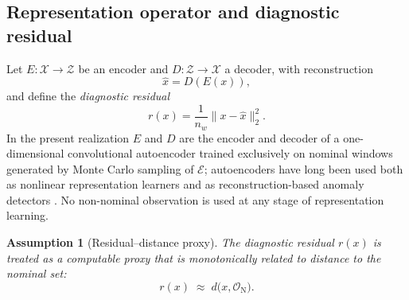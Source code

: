 \documentclass[a4paper]{cas-sc}
\newtheorem{assumption}{Assumption}
\newcommand{\X}{\ensuremath{\mathcal{X}}}
\newcommand{\Z}{\ensuremath{\mathcal{Z}}}
\newcommand{\EtaSpace}{\ensuremath{\mathcal{E}}}
\newcommand{\residual}{\ensuremath{r}}
\begin{document}
\subsection{Representation operator and diagnostic residual}
\label{subsec:representation_operator}

Let \(E:\X\rightarrow\Z\) be an encoder and \(D:\Z\rightarrow\X\) a
decoder, with reconstruction
\begin{equation}
\hat{x} = D(E(x)),
\label{eq:reconstruction}
\end{equation}
and define the \emph{diagnostic residual}
\begin{equation}
\residual(x) = \frac{1}{n_w}\bigl\|x-\hat{x}\bigr\|_2^2 .
\label{eq:residual}
\end{equation}
In the present realization \(E\) and \(D\) are the encoder and decoder of a
one-dimensional convolutional autoencoder trained exclusively on nominal
windows generated by Monte Carlo sampling of \(\EtaSpace\); autoencoders
have long been used both as nonlinear representation learners
\citep{hinton2006} and as reconstruction-based anomaly detectors
\citep{sakurada2014}. No non-nominal observation is used at any stage of
representation learning.

\begin{assumption}[Residual--distance proxy]
\label{ass:residual_proxy}
The diagnostic residual \(\residual(x)\) is treated as a computable proxy
that is monotonically related to distance to the nominal set:
\begin{equation}
\residual(x) \;\approx\; d\bigl(x,\mathcal{O}_{\mathrm N}\bigr).
\label{eq:distance_proxy}
\end{equation}
\end{assumption}
\end{document}
